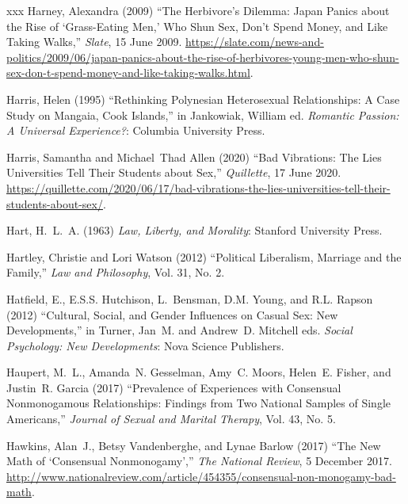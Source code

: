 \documentclass[]{jlreq} \usepackage{mystyle}
\begin{document}
\begin{thebibliography}{xxx}
Harney, Alexandra (2009) ``The Herbivore's Dilemma: Japan Panics about the Rise
  of `Grass-Eating Men,' Who Shun Sex, Don't Spend Money, and Like Taking
  Walks,'' \emph{Slate}, 15 June 2009.
  \url{https://slate.com/news-and-politics/2009/06/japan-panics-about-the-rise-of-herbivores-young-men-who-shun-sex-don-t-spend-money-and-like-taking-walks.html}.

Harris, Helen (1995) ``Rethinking Polynesian Heterosexual Relationships: A Case
  Study on Mangaia, Cook Islands,'' in Jankowiak, William ed.   \textit{
  Romantic Passion: A Universal Experience?}: Columbia University Press.

Harris, Samantha and Michael~Thad Allen (2020) ``Bad Vibrations: The Lies
  Universities Tell Their Students about Sex,'' \emph{Quillette}, 17 June 2020.
  \url{https://quillette.com/2020/06/17/bad-vibrations-the-lies-universities-tell-their-students-about-sex/}.

Hart, H.~L.~A. (1963)  \textit{ Law, Liberty, and Morality}: Stanford
  University Press.

Hartley, Christie and Lori Watson (2012) ``Political Liberalism, Marriage and
  the Family,'' \textit{ Law and Philosophy}, Vol. 31, No. 2.

Hatfield, E., E.S.S. Hutchison, L.~Bensman, D.M. Young, and R.L. Rapson (2012)
  ``Cultural, Social, and Gender Influences on Casual Sex: New Developments,''
  in Turner, Jan~M. and Andrew~D. Mitchell eds.   \textit{ Social Psychology:
  New Developments}: Nova Science Publishers.

Haupert, M.~L., Amanda~N. Gesselman, Amy~C. Moors, Helen~E. Fisher, and
  Justin~R. Garcia (2017) ``Prevalence of Experiences with Consensual
  Nonmonogamous Relationships: Findings from Two National Samples of Single
  Americans,'' \textit{ Journal of Sexual and Marital Therapy}, Vol. 43, No. 5.

Hawkins, Alan~J., Betsy Vandenberghe, and Lynae Barlow (2017) ``The New Math of
  `Consensual Nonmonogamy','' \emph{The National Review}, 5 December 2017.
  \url{http://www.nationalreview.com/article/454355/consensual-non-monogamy-bad-math}.


\end{thebibliography}
\end{document}
